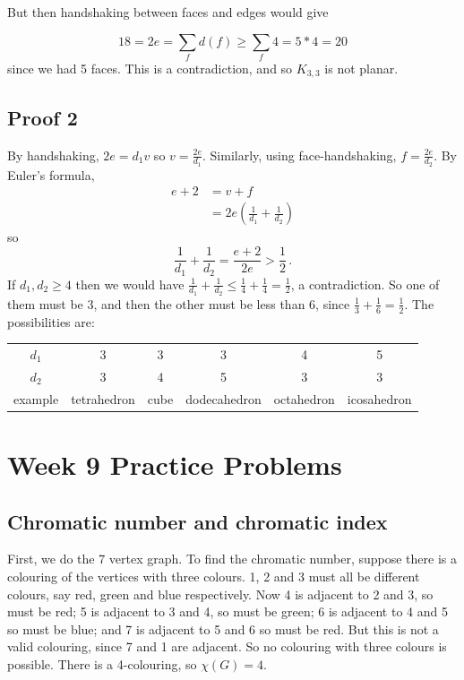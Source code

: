 \documentclass{amsart}
\begin{document}
But then handshaking between faces and edges would give

$$18=2e=\sum_f d(f)\geq \sum_f 4=5*4=20$$
since we had 5 faces.  This is a contradiction, and so $K_{3,3}$ is not planar.

\subsection{Proof 2} 

  By handshaking, $2e=d_1v$ so $v=\frac{2e}{d_1}$. Similarly, using face-handshaking, $f=\frac{2e}{d_2}$. By Euler's formula,
\begin{align*}
e+2&=v+f \\
&=2e\left(\frac{1}{d_1}+\frac{1}{d_2}\right)
\end{align*}
so
\[
\frac{1}{d_1}+\frac{1}{d_2}=\frac{e+2}{2e}>\frac{1}{2}\,.
\]
If $d_1, d_2\geq 4$ then we would have $\frac{1}{d_1}+\frac{1}{d_2}\leq\frac{1}{4}+\frac{1}{4}=\frac{1}{2}$, a contradiction. So one of them must be 3, and then the other must be less than 6, since $\frac{1}{3}+\frac{1}{6}=\frac{1}{2}$. The possibilities are:

\begin{tabular}{|c|ccccc|}
\hline
$d_1$ & 3 & 3 & 3 & 4 & 5 \\
$d_2$ & 3 & 4 & 5 & 3 & 3 \\
example & tetrahedron & cube & dodecahedron & octahedron & icosahedron \\
\hline
\end{tabular}

\section{Week 9 Practice Problems}


\subsection{Chromatic number and chromatic index}

First, we do the 7 vertex graph. To find the chromatic number, suppose there is a colouring of the vertices with three colours. 1, 2 and 3 must all be different colours, say red, green and blue respectively. Now 4 is adjacent to 2 and 3, so must be red; 5 is adjacent to 3 and 4, so must be green; 6 is adjacent to 4 and 5 so must be blue; and 7 is adjacent to 5 and 6 so must be red. But this is not a valid colouring, since 7 and 1 are adjacent. So no colouring with three colours is possible. There is a 4-colouring, so $\chi(G)=4$.
\end{document}
